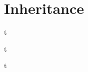 \documentclass[../lecture5-objectorientation.tex]{subfiles}
\begin{document}
\section{Inheritance}


\begin{frame}[fragile]{}
t
\end{frame}


\begin{frame}[fragile]{}
t
\end{frame}


\begin{frame}[fragile]{}
t
\end{frame}

\end{document}
